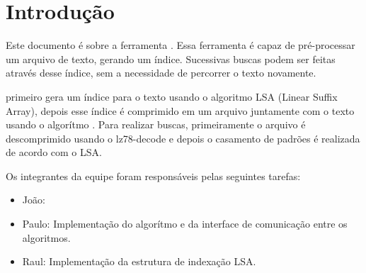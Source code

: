 \section{Introdução}

Este documento é sobre a ferramenta \ipmt. Essa ferramenta é capaz de
pré-processar um arquivo de texto, gerando um índice. Sucessivas buscas podem
ser feitas através desse índice, sem a necessidade de percorrer o texto
novamente.


\ipmt primeiro gera um índice para o texto usando o algoritmo LSA (Linear Suffix
Array), depois esse índice é comprimido em um arquivo juntamente com o texto
usando o algorítmo \lz. Para realizar buscas, primeiramente o arquivo é
descomprimido usando o lz78-decode e depois o casamento de padrões é realizada
de acordo com o LSA. 


Os integrantes da equipe foram responsáveis pelas seguintes tarefas:
\begin{itemize}
\item João: 

\item Paulo: Implementação do algorítmo \lz e da interface de comunicação entre os algoritmos.

\item Raul: Implementação da estrutura de indexação LSA.

\end{itemize}

